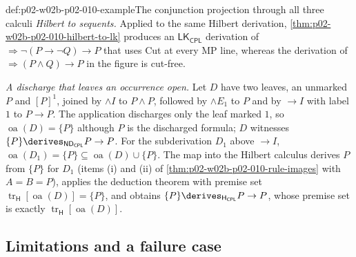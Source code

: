 \begin{hbexample}{def:p02-w02b-p02-010-example}{The conjunction projection through all three calculi}
\emph{Hilbert to sequents.}  Applied to the same Hilbert derivation,
\cref{thm:p02-w02b-p02-010-hilbert-to-lk} produces an
\(\mathsf{LK}_{\mathsf{CPL}}\) derivation of
\(\Rightarrow\neg(P\to\neg Q)\to P\) that uses Cut at every MP line, whereas
the derivation of \(\Rightarrow(P\land Q)\to P\) in the figure is cut-free.

\emph{A discharge that leaves an occurrence open.}  Let \(D\) have two
leaves, an unmarked \(P\) and \([P]^1\), joined by \(\land I\) to
\(P\land P\), followed by \(\land E_1\) to \(P\) and by \(\to I\) with label
\(1\) to \(P\to P\).  The application discharges only the leaf marked \(1\),
so \(\operatorname{oa}(D)=\{P\}\) although \(P\) is the discharged formula;
\(D\) witnesses \(\{P\}\derives_{\mathsf{ND}_{\mathsf{CPL}}}P\to P\).  For
the subderivation \(D_1\) above \(\to I\),
\(\operatorname{oa}(D_1)=\{P\}\subseteq\operatorname{oa}(D)\cup\{P\}\).
The map into the Hilbert calculus derives \(P\) from \(\{P\}\) for \(D_1\)
(items (i) and (ii) of \cref{thm:p02-w02b-p02-010-rule-images} with
\(A=B=P\)), applies the deduction theorem with premise set
\(\operatorname{tr}_{\mathsf H}[\operatorname{oa}(D)]=\{P\}\), and obtains
\(\{P\}\derives_{\mathsf H_{\mathsf{CPL}}}P\to P\), whose premise set is
exactly \(\operatorname{tr}_{\mathsf H}[\operatorname{oa}(D)]\).
\end{hbexample}

\subsection{Limitations and a failure case}
\label{sec:p02-w02b-p02-010-limits}

